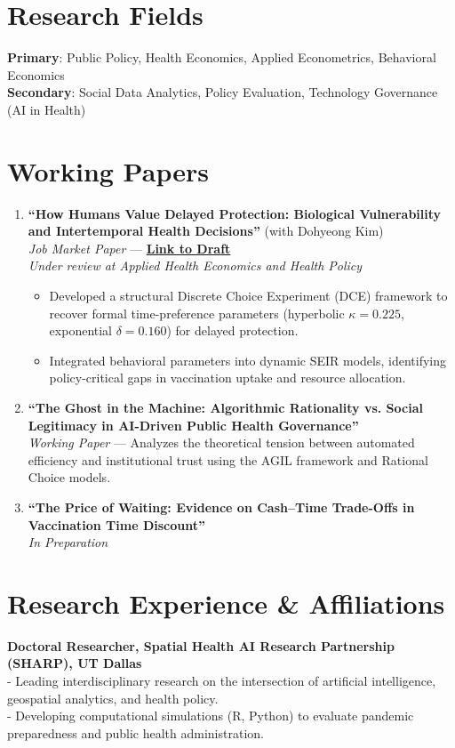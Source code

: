 \documentclass[11pt]{article}
\begin{document}
\section*{Research Fields}
\textbf{Primary}: Public Policy, Health Economics, Applied Econometrics, Behavioral Economics \\
\textbf{Secondary}: Social Data Analytics, Policy Evaluation, Technology Governance (AI in Health)

\section*{Working Papers}
\begin{enumerate}
    \item \textbf{``How Humans Value Delayed Protection: Biological Vulnerability and Intertemporal Health Decisions''} (with Dohyeong Kim) \\
    \textit{Job Market Paper} --- \href{https://yichao2022.github.io/jmp.pdf}{\textbf{Link to Draft}} \\ \textit{Under review at Applied Health Economics and Health Policy}
    \begin{itemize}[noitemsep, topsep=0pt]
        \item Developed a structural Discrete Choice Experiment (DCE) framework to recover formal time-preference parameters (hyperbolic $\kappa = 0.225$, exponential $\delta = 0.160$) for delayed protection.
        \item Integrated behavioral parameters into dynamic SEIR models, identifying policy-critical gaps in vaccination uptake and resource allocation.
    \end{itemize}

    \item \textbf{``The Ghost in the Machine: Algorithmic Rationality vs. Social Legitimacy in AI-Driven Public Health Governance''} \\
    \textit{Working Paper} --- Analyzes the theoretical tension between automated efficiency and institutional trust using the AGIL framework and Rational Choice models.

    \item \textbf{``The Price of Waiting: Evidence on Cash–Time Trade-Offs in Vaccination Time Discount''} \\
    \textit{In Preparation}
\end{enumerate}

\section*{Research Experience \& Affiliations}
\textbf{Doctoral Researcher, Spatial Health AI Research Partnership (SHARP), UT Dallas} \\
- Leading interdisciplinary research on the intersection of artificial intelligence, geospatial analytics, and health policy. \\
- Developing computational simulations (R, Python) to evaluate pandemic preparedness and public health administration.
\end{document}
